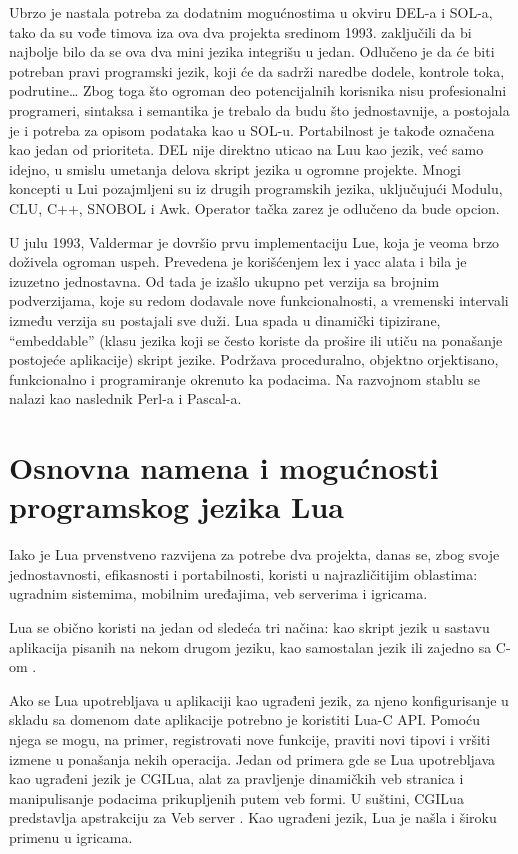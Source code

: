\documentclass[a4paper]{article}
\begin{document}
Ubrzo je nastala potreba za dodatnim mogućnostima u okviru DEL-a i SOL-a, tako da su vođe timova iza ova dva projekta sredinom 1993. zaključili da bi najbolje bilo da se ova dva mini jezika integrišu u jedan. Odlučeno je da će biti potreban pravi programski jezik, koji će da sadrži naredbe dodele, kontrole toka, podrutine… Zbog toga što ogroman deo potencijalnih korisnika nisu profesionalni programeri, sintaksa i semantika je trebalo da budu što jednostavnije, a postojala je i potreba za opisom podataka kao u SOL-u. Portabilnost je takođe označena kao jedan od prioriteta. DEL nije direktno uticao na Luu kao jezik, već samo idejno, u smislu umetanja delova skript jezika u ogromne projekte. Mnogi koncepti u Lui pozajmljeni su iz drugih programskih jezika, uključujući Modulu, CLU, C++, SNOBOL i Awk. Operator tačka zarez je odlučeno da bude opcion. 

U julu 1993, Valdermar je dovršio prvu implementaciju Lue, koja je veoma brzo doživela ogroman uspeh. Prevedena je korišćenjem lex i yacc alata i bila je izuzetno jednostavna. Od tada je izašlo ukupno pet verzija sa brojnim podverzijama, koje su redom dodavale nove funkcionalnosti, a vremenski intervali između verzija su postajali sve duži. 
Lua spada u dinamički tipizirane, “embeddable” (klasu jezika koji se često koriste da prošire ili utiču na ponašanje postojeće aplikacije) skript jezike. Podržava proceduralno, objektno orjektisano, funkcionalno i programiranje okrenuto ka podacima. Na razvojnom stablu se nalazi kao naslednik Perl-a i Pascal-a. \cite{evolution}




\section{Osnovna namena i mogućnosti programskog jezika Lua}	
\label{sec:namena_i_mogucnosti}

Iako je Lua prvenstveno razvijena za potrebe dva projekta, danas se, zbog svoje jednostavnosti, efikasnosti i portabilnosti, koristi u najrazličitijim oblastima: ugradnim sistemima, mobilnim uređajima, veb serverima i igricama.

Lua se obično koristi na jedan od sledeća tri načina: kao skript jezik u sastavu aplikacija pisanih na nekom drugom jeziku, kao samostalan jezik ili zajedno sa C-om \cite{bookProgInLua}. 

Ako se Lua upotrebljava u aplikaciji kao ugrađeni jezik, za njeno konfigurisanje u skladu sa domenom date aplikacije potrebno je koristiti Lua-C API. Pomoću njega se mogu, na primer, registrovati nove funkcije, praviti novi tipovi i vršiti izmene u ponašanja nekih operacija. Jedan od primera gde se Lua upotrebljava kao ugrađeni jezik je CGILua, alat za pravljenje dinamičkih veb stranica i manipulisanje podacima prikupljenih putem veb formi. U suštini, CGILua predstavlja apstrakciju za Veb server \cite{keplerProject}. Kao ugrađeni jezik, Lua je našla i široku primenu u igricama.
\end{document}
